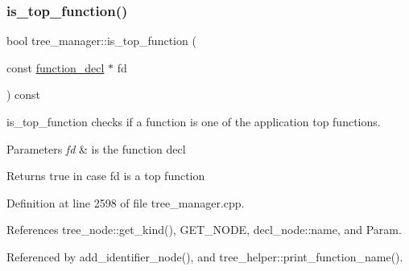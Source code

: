 \subsubsection{\texorpdfstring{is\+\_\+top\+\_\+function()}{is\_top\_function()}}
{\footnotesize\ttfamily bool tree\+\_\+manager\+::is\+\_\+top\+\_\+function (\begin{DoxyParamCaption}\item[{const \hyperlink{structfunction__decl}{function\+\_\+decl} $\ast$}]{fd }\end{DoxyParamCaption}) const}



is\+\_\+top\+\_\+function checks if a function is one of the application top functions. 


\begin{DoxyParams}{Parameters}
{\em fd} & is the function decl \\
\hline
\end{DoxyParams}
\begin{DoxyReturn}{Returns}
true in case fd is a top function 
\end{DoxyReturn}


Definition at line 2598 of file tree\+\_\+manager.\+cpp.



References tree\+\_\+node\+::get\+\_\+kind(), G\+E\+T\+\_\+\+N\+O\+DE, decl\+\_\+node\+::name, and Param.



Referenced by add\+\_\+identifier\+\_\+node(), and tree\+\_\+helper\+::print\+\_\+function\+\_\+name().

